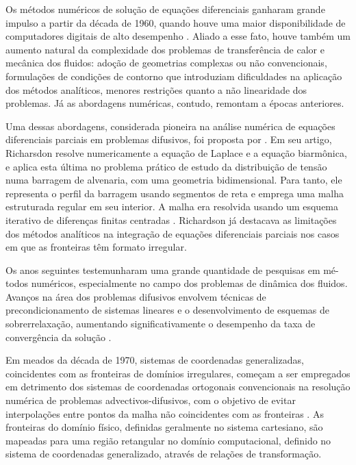 Os métodos numéricos de solução de equações diferenciais ganharam grande impulso a partir da década de 1960, quando houve uma maior disponibilidade
de computadores digitais de alto desempenho \citep{livro_tanehill}. Aliado a esse fato, houve também um aumento natural da complexidade dos problemas de transferência
de calor e mecânica dos fluidos: adoção de geometrias complexas ou não convencionais, formulações de condições de contorno que introduziam dificuldades na
aplicação dos métodos analíticos, menores restrições quanto a não linearidade dos problemas. Já as abordagens numéricas, contudo, remontam a épocas anteriores. 

Uma dessas abordagens, considerada pioneira na análise numérica de equações diferenciais parciais em problemas
difusivos, foi proposta por \cite{artigo_richardson}. Em seu artigo, Richarsdon resolve numericamente a equação de Laplace e a equação biarmônica, e aplica esta última no problema prático de estudo da distribuição de tensão numa
barragem de alvenaria, com uma geometria bidimensional. Para tanto, ele representa o perfil da barragem usando segmentos de reta e emprega uma malha estruturada regular em seu interior. A malha
era resolvida usando um esquema iterativo de diferenças finitas centradas \citep{livro_tanehill}. Richardson já destacava as limitações dos métodos analíticos na integração de equações diferenciais parciais nos casos em que as fronteiras têm formato irregular.

Os anos seguintes testemunharam uma grande quantidade de pesquisas em mé-todos numéricos, especialmente no campo dos problemas de dinâmica dos fluidos. Avanços na área dos
problemas difusivos envolvem técnicas de precondicionamento de sistemas lineares e o desenvolvimento de esquemas de sobrerrelaxação, aumentando significativamente
o desempenho da taxa de convergência da solução \citep{artigo_frankel, artigo_fedorenko}.

Em meados da década de 1970, sistemas de coordenadas generalizadas, coincidentes com as fronteiras de domínios irregulares,
começam a ser empregados em detrimento dos sistemas de coordenadas ortogonais convencionais na resolução numérica de problemas advectivos-difusivos,
com o objetivo de evitar interpolações entre pontos da malha não coincidentes com as fronteiras \citep{livro_maliska}. As fronteiras do domínio físico, definidas geralmente no sistema 
cartesiano, são mapeadas para uma região retangular no domínio computacional, definido no sistema de coordenadas generalizado, através de relações de transformação.

